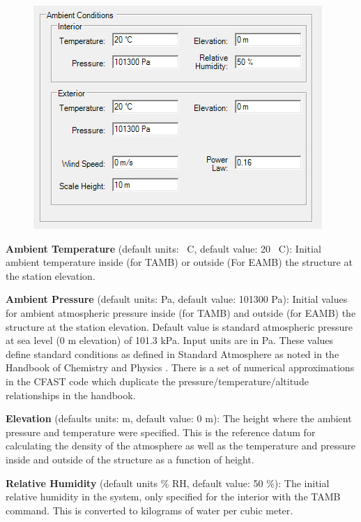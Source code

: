\begin{figure}[h!]
\begin{center}
\includegraphics[width=4.313in]{FIGURES/Input_File/Ambient_Conditions}
\end{center}
\end{figure}

\textbf{Ambient Temperature} (default units: \degc~C, default value: 20 \degc~C): Initial ambient temperature inside (for TAMB) or outside (For EAMB) the structure at the station elevation.

\textbf{Ambient Pressure} (default units: Pa, default value: 101300 Pa): Initial values for ambient atmospheric pressure inside (for TAMB) and outside (for EAMB) the structure at the station elevation. Default value is standard atmospheric pressure at sea level (0 m elevation) of 101.3 kPa. Input units are in Pa. These values define standard conditions as defined in Standard Atmosphere as noted in the Handbook of Chemistry and Physics  . There is a set of numerical approximations in the CFAST code which duplicate the pressure/temperature/altitude relationships in the handbook.

\textbf{Elevation} (defaults units: m, default value: 0 m): The height where the ambient pressure and temperature were specified.  This is the reference datum for calculating the density of the atmosphere as well as the temperature and pressure inside and outside of the structure as a function of height.  

\textbf{Relative Humidity} (default units \% RH, default value: 50 \%): The initial relative humidity in the system, only specified for the interior with the TAMB command.  This is converted to kilograms of water per cubic meter.

